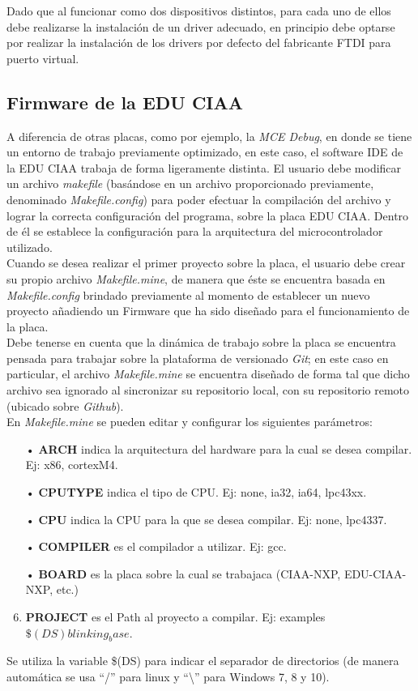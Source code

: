\documentclass[12pt,letterpaper]{article}
\begin{document}
Dado que al funcionar como dos dispositivos distintos, para cada uno de ellos debe realizarse la instalación de un driver adecuado, en principio debe optarse por realizar la instalación de los drivers por defecto del fabricante FTDI para puerto virtual. %

\subsection{Firmware de la EDU CIAA}
 
A diferencia de otras placas, como por ejemplo, la \textit{MCE Debug}, en donde se tiene un entorno de trabajo previamente optimizado, en este caso, el software IDE de la EDU CIAA trabaja de forma ligeramente distinta. El usuario debe modificar un archivo \textit{makefile} (basándose en un archivo proporcionado previamente, denominado \textit{Makefile.config}) para poder efectuar la compilación del archivo y lograr la correcta configuración del programa, sobre la placa EDU CIAA. Dentro de él se establece la configuración para la arquitectura del microcontrolador utilizado.
 \\
 
Cuando se desea realizar el primer proyecto sobre la placa, el usuario debe crear su propio archivo \textit{Makefile.mine}, de manera que éste se encuentra basada en \textit{Makefile.config} brindado previamente al momento de establecer un nuevo proyecto añadiendo un Firmware que ha sido diseñado para el funcionamiento de la placa.
 \\
 
Debe tenerse en cuenta que la dinámica de trabajo sobre la placa se encuentra pensada para trabajar sobre la plataforma de versionado \textit{Git}; en este caso en particular, el archivo \textit{Makefile.mine} se encuentra diseñado de forma tal que dicho archivo sea ignorado al sincronizar su repositorio local, con su repositorio remoto (ubicado sobre \textit{Github}).
 \\
 
En \textit{Makefile.mine} se pueden editar y configurar los siguientes parámetros:
\begin{enumerate}
\item[•] \textbf{ARCH}  indica la arquitectura del hardware para la cual se desea compilar. Ej: x86, cortexM4.
\item[•] \textbf{CPUTYPE} indica el tipo de CPU. Ej: none, ia32, ia64, lpc43xx.
\item[•] \textbf{CPU} indica la CPU para la que se desea compilar. Ej: none, lpc4337.
\item[•] \textbf{COMPILER }es el compilador a utilizar. Ej: gcc.
\item[•] \textbf{BOARD }es la placa sobre la cual se trabajaca (CIAA-NXP, EDU-CIAA-NXP, etc.)
\item \textbf{PROJECT }es el Path al proyecto a compilar. Ej: examples$\$(DS)blinking_base$.
\end{enumerate}
Se utiliza la variable \$(DS) para indicar el separador de directorios (de manera automática se usa ``/'' para linux y ``\textbackslash{}'' para Windows 7, 8 y 10).
 \\
 
\end{document}

